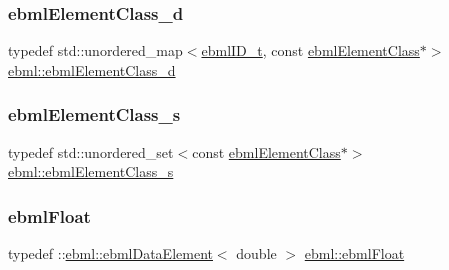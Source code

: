 \mbox{\label{namespaceebml_a103756ab7f2c1c3c2bbc34334bd9b416}} 
\subsubsection{\texorpdfstring{ebml\+Element\+Class\+\_\+d}{ebmlElementClass\_d}}
{\footnotesize\ttfamily typedef std\+::unordered\+\_\+map$<$\mbox{\hyperlink{namespaceebml_a86c5f604ddf12a74aa9812e997a58691}{ebml\+I\+D\+\_\+t}}, const \mbox{\hyperlink{classebml_1_1ebmlElementClass}{ebml\+Element\+Class}}$\ast$$>$ \mbox{\hyperlink{namespaceebml_a103756ab7f2c1c3c2bbc34334bd9b416}{ebml\+::ebml\+Element\+Class\+\_\+d}}}

\mbox{\label{namespaceebml_a014ea85f559c01fc8f53b63240eecc8a}} 
\subsubsection{\texorpdfstring{ebml\+Element\+Class\+\_\+s}{ebmlElementClass\_s}}
{\footnotesize\ttfamily typedef std\+::unordered\+\_\+set$<$const \mbox{\hyperlink{classebml_1_1ebmlElementClass}{ebml\+Element\+Class}}$\ast$$>$ \mbox{\hyperlink{namespaceebml_a014ea85f559c01fc8f53b63240eecc8a}{ebml\+::ebml\+Element\+Class\+\_\+s}}}

\mbox{\label{namespaceebml_af998fa3b620e1bb7363e1426c9910b9c}} 
\subsubsection{\texorpdfstring{ebml\+Float}{ebmlFloat}}
{\footnotesize\ttfamily typedef \+::\mbox{\hyperlink{classebml_1_1ebmlDataElement}{ebml\+::ebml\+Data\+Element}}$<$ double $>$ \mbox{\hyperlink{namespaceebml_af998fa3b620e1bb7363e1426c9910b9c}{ebml\+::ebml\+Float}}}

\mbox{\label{namespaceebml_a2e365f10ba5435bdd5c1fd909a601f31}} 
